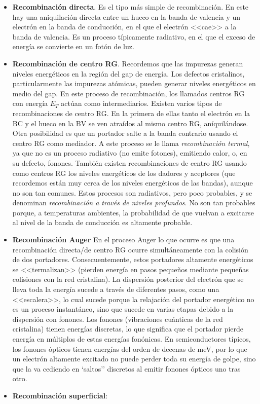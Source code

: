 \begin{itemize}
	\item \textbf{Recombinación directa}. Es el tipo más simple de recombinación. En este hay una aniquilación directa entre un hueco en la banda de valencia y un electrón en la banda de conducción, en el que el electrón <<cae>> a la banda de valencia. Es un proceso típicamente radiativo, en el que el exceso de energía se convierte en un fotón de luz. 
	
	\item \textbf{Recombinación de centro RG}. Recordemos que las impurezas generan niveles energéticos en la región del gap de energía. Los defectos cristalinos, particularmente las impurezas atómicas, pueden generar niveles energéticos en medio del gap. En este proceso de recombinación, los llamados centros RG con energía $E_T$ actúan como intermediarios. Existen varios tipos de recombinaciones de centro RG. En la primera de ellas tanto el electrón en la BC y el hueco en la BV se ven atraídos al mismo centro RG, aníquilándose. Otra posibilidad es que un portador salte a la banda contrario usando el centro RG como mediador. A este proceso se le llama \textit{recombinación termal}, ya que no es un proceso radiativo (no emite fotones), emitiendo calor, o, en su defecto, fonones. También existen recombinaciones de centro RG usando como centros RG los niveles energéticos de los dadores y aceptores (que recordemos están muy cerca de los niveles energéticos de las bandas), aunque no son tan comunes. Estos procesos son radiativos, pero poco probables, y se denominan \textit{recombinación a través de niveles profundos}. No son tan probables porque, a temperaturas ambientes, la probabilidad de que vuelvan a excitarse al nivel de la banda de conducción es altamente probable.
	
	\item \textbf{Recombinación Auger} En el proceso Auger lo que ocurre es que una recombinación directa/de centro RG ocurre simultáneamente con la colisión de dos portadores. Consecuentemente, estos portadores altamente energéticos se <<termalizan>>  (pierden energía en pasos pequeños mediante pequeñas colisiones con la red cristalina). La dispersión posterior del electrón que se lleva toda la energía sucede a través de diferentes pasos, como una <<escalera>>, lo cual sucede  porque la relajación del portador energético no es un proceso instantáneo, sino que sucede en varias etapas debido a la dispersión con fonones. Los fonones (vibraciones cuánticas de la red cristalina) tienen energías discretas, lo que significa que el portador pierde energía en múltiplos de estas energías fonónicas. En semiconductores típicos, los fonones ópticos tienen energías del orden de decenas de meV, por lo que un electrón altamente excitado no puede perder toda su energía de golpe, sino que la va cediendo en `saltos'' discretos al emitir fonones ópticos uno tras otro.
	
	\item \textbf{Recombinación superficial}: 
\end{itemize}

